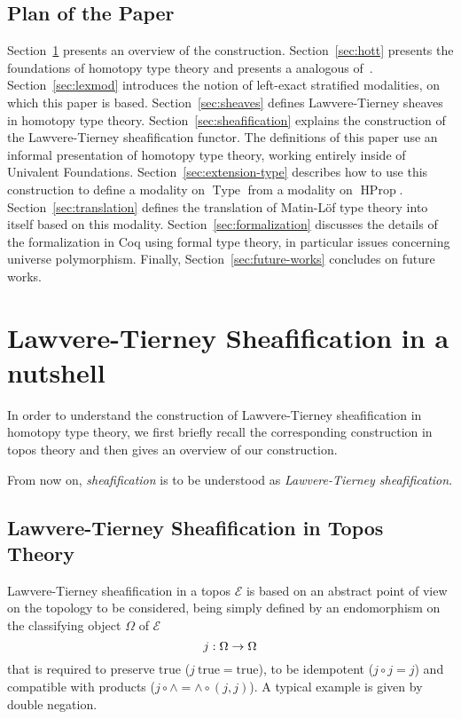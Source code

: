\documentclass[preprint,9pt,numbers]{sigplanconf}
\DeclareMathOperator{\Type}{Type}
\DeclareMathOperator{\HProp}{HProp}
\newcommand \True {\mathrm{true}}
\newcommand \E {\mathcal{E}}
\newenvironment{mymath}[1][-0em]{%
  \newcommand\mymathaux{\vspace{#1}}%
  \vspace{#1}%
  \begin{equation*}%
  }{ %
    \mymathaux%
  \end{equation*}}
\begin{document}
\subsection{Plan of the Paper}

Section~\ref{sec:lawv-tiern-nutshell} presents an overview of the
construction.
% 
Section~\ref{sec:hott} presents the foundations of homotopy type theory
and presents a analogous of~\cite[Corollary 6.2.3.5]{lurie}. 
%
Section~\ref{sec:lexmod} introduces the notion of left-exact stratified
modalities, on which this paper is based.
%
Section~\ref{sec:sheaves} defines Lawvere-Tierney sheaves in homotopy
type theory.
%
Section~\ref{sec:sheafification} explains the construction of the
Lawvere-Tierney sheafification functor.
%
The definitions of this paper use an informal presentation of
homotopy type theory, working entirely inside of Univalent
Foundations. 
Section~\ref{sec:extension-type} describes how to use this
construction to define a modality on $\Type$ from a modality on
$\HProp$.
%
%
Section~\ref{sec:translation} defines the translation of Matin-Löf
type theory into itself based on this modality. 
%
Section~\ref{sec:formalization} discusses the details of the
formalization in Coq using formal type theory, in particular issues
concerning universe polymorphism.
%
Finally, Section~\ref{sec:future-works} concludes on future works.

\section{Lawvere-Tierney Sheafification in a nutshell}
\label{sec:lawv-tiern-nutshell}


In order to understand the construction of Lawvere-Tierney sheafification in homotopy
type theory, we first briefly recall the corresponding construction in
topos theory and then gives an overview of our construction.

From now on, {\em sheafification} is to be understood as {\em
  Lawvere-Tierney sheafification}.

\subsection{Lawvere-Tierney Sheafification in Topos Theory}
\label{sec:lawv-tiern-sheaf}


Lawvere-Tierney sheafification in a topos $\E$ is based on an abstract
point of view on the topology to be considered, being simply defined by an
endomorphism on the classifying object $\Omega$ of $\E$  
%
\begin{mymath}
j : \Omega \rightarrow \Omega
\end{mymath}%
%
that is required to preserve $\True$ ($j \ \True = \True$), to be
idempotent ($j \circ j = j$) and compatible with products ($j \circ
\wedge = \wedge \circ (j, j)$).
%
A typical example is given by double negation.
\end{document}
